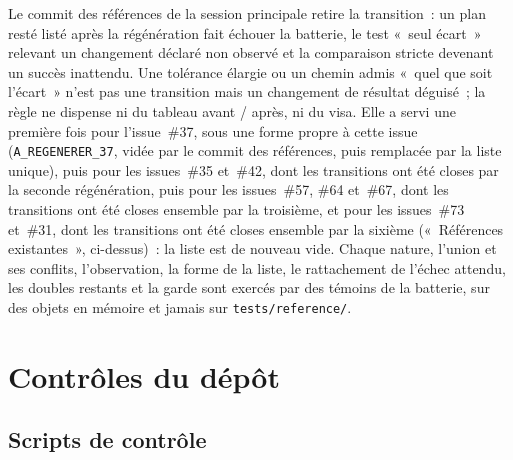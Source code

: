 \documentclass[a4paper,11pt]{article}
\newcommand{\code}[1]{\texttt{\small #1}}
\begin{document}
\noindent
Le commit des références de la session principale retire la transition~:
un plan resté listé après la régénération fait échouer la batterie, le test
«~seul écart~» relevant un changement déclaré non observé et la comparaison
stricte devenant un succès inattendu. Une tolérance élargie ou un chemin
admis «~quel que soit l'écart~» n'est pas une transition mais un changement
de résultat déguisé~; la règle ne dispense ni du tableau avant / après, ni
du visa. Elle a servi une première fois pour l'issue~\#37, sous une forme
propre à cette issue (\code{A\_REGENERER\_37}, vidée par le commit des
références, puis remplacée par la liste unique), puis pour les issues~\#35
et~\#42, dont les transitions ont été closes par la seconde régénération,
puis pour les issues~\#57, \#64 et~\#67, dont les transitions ont été
closes ensemble par la troisième, et pour les issues~\#73 et~\#31, dont
les transitions ont été closes ensemble par la sixième («~Références
existantes~», ci-dessus)~: la liste est de nouveau vide. Chaque
nature, l'union et ses conflits, l'observation, la forme de la liste, le
rattachement de l'échec attendu, les doubles restants et la garde sont
exercés par des témoins de la batterie, sur des objets en mémoire et jamais
sur \code{tests/reference/}.

\section{Contrôles du dépôt}
\label{sec:controles-depot}

\subsection{Scripts de contrôle}
\label{sec:scripts-controle}
\end{document}
